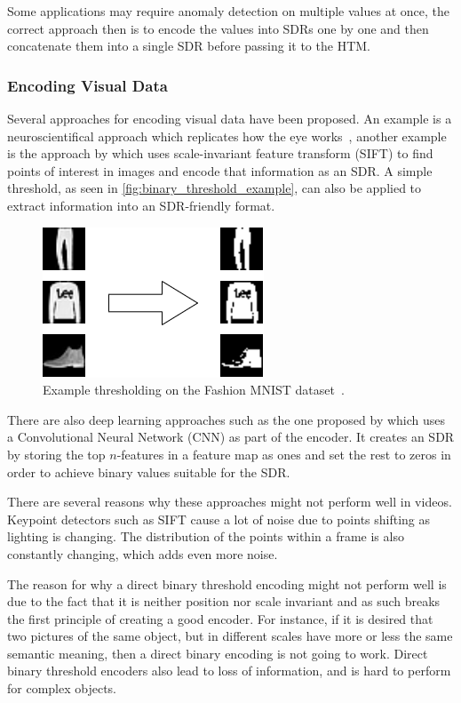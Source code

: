 Some applications may require anomaly detection on multiple values at once, the correct approach then is to encode the values into SDRs one by one and then concatenate them into a single SDR before passing it to the HTM.
\subsubsection{Encoding Visual Data}
Several approaches for encoding visual data have been proposed. An example is a neuroscientifical approach which replicates how the eye works~\cite{eyeencoder}, another example is the approach by \textcite{ObjectDetectionSIFT} which uses scale-invariant feature transform (SIFT) to find points of interest in images and encode that information as an SDR. A simple threshold, as seen in \autoref{fig:binary_threshold_example}, can also be applied to extract information into an SDR-friendly format.
\begin{figure}[H]
    \centering
    \includegraphics[width=0.5\linewidth]{resources/related_works/binary_threshold_example.png}
    \caption[Thresholding Example]{Example thresholding on the Fashion MNIST dataset~\cite{mnist_fashion}.}
    \label{fig:binary_threshold_example}
\end{figure}
\par
There are also deep learning approaches such as the one proposed by \textcite{CNN_HTM} which uses a Convolutional Neural Network (CNN) as part of the encoder. It creates an SDR by storing the top $n$-features in a feature map as ones and set the rest to zeros in order to achieve binary values suitable for the SDR.
\par
There are several reasons why these approaches might not perform well in videos. Keypoint detectors such as SIFT cause a lot of noise due to points shifting as lighting is changing. The distribution of the points within a frame is also constantly changing, which adds even more noise.
\par
The reason for why a direct binary threshold encoding might not perform well is due to the fact that it is neither position nor scale invariant and as such breaks the first principle of creating a good encoder. For instance, if it is desired that two pictures of the same object, but in different scales have more or less the same semantic meaning, then a direct binary encoding is not going to work. Direct binary threshold encoders also lead to loss of information, and is hard to perform for complex objects.
